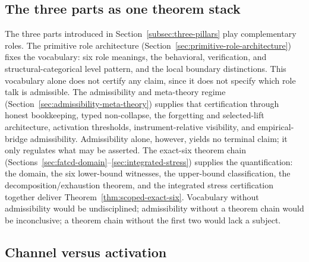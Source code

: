 \subsection{The three parts as one theorem stack}\label{subsec:discussion-pillars}

The three parts introduced in Section~\ref{subsec:three-pillars} play
complementary roles. The primitive role architecture
(Section~\ref{sec:primitive-role-architecture}) fixes the vocabulary:
six role meanings, the behavioral, verification, and
structural-categorical level pattern, and the local boundary
distinctions. This vocabulary alone does not certify any claim,
since it does not specify which role talk is admissible. The
admissibility and meta-theory regime
(Section~\ref{sec:admissibility-meta-theory}) supplies that
certification through honest bookkeeping, typed non-collapse, the
forgetting and selected-lift architecture, activation thresholds,
instrument-relative visibility, and empirical-bridge admissibility.
Admissibility alone, however, yields no terminal claim; it only
regulates what may be asserted. The exact-six theorem chain
(Sections~\ref{sec:fatcd-domain}--\ref{sec:integrated-stress})
supplies the quantification: the \FATCD{} domain, the six
lower-bound witnesses, the upper-bound classification, the
decomposition/exhaustion theorem, and the integrated stress
certification together deliver Theorem~\ref{thm:scoped-exact-six}.
Vocabulary without admissibility would be undisciplined; admissibility
without a theorem chain would be inconclusive; a theorem chain without
the first two would lack a subject.

\subsection{Channel versus activation}\label{subsec:discussion-channel-vs-activation}

